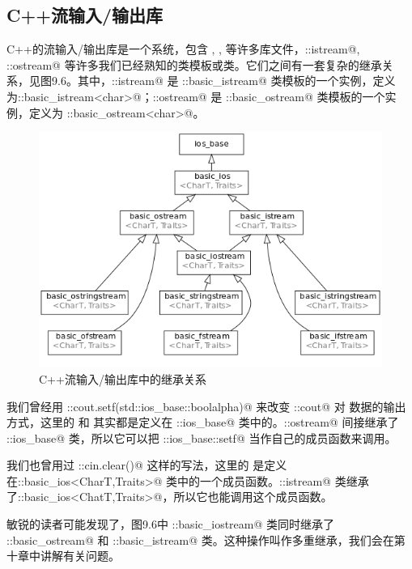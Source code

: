 \subsection*{C++流输入/输出库}
C++的流输入/输出库是一个系统，包含 \lstinline@iostream@, \lstinline@fstream@, \lstinline@sstream@ 等许多库文件，\newline\lstinline@std::istream@, \lstinline@std::ostream@ 等许多我们已经熟知的类模板或类。它们之间有一套复杂的继承关系，见图9.6。其中，\lstinline@std::istream@ 是 \lstinline@std::basic_istream@ 类模板的一个实例，定义为\newline\lstinline@std::basic_istream<char>@；\lstinline@std::ostream@ 是 \lstinline@std::basic_ostream@ 类模板的一个实例，定义为 \lstinline@std::basic_ostream<char>@。\par
\begin{figure}[htbp]
    \centering
    \includegraphics[width=.8\textwidth]{../images/generalized_parts/09_inheritance_diagram_of_io_library.png}
    \caption{C++流输入/输出库中的继承关系}
\end{figure}
我们曾经用 \lstinline@std::cout.setf(std::ios_base::boolalpha)@ 来改变 \lstinline@std::cout@ 对 \lstinline@bool@ 数据的输出方式，这里的 \lstinline@setf@ 和 \lstinline@fmtflags@ 其实都是定义在 \lstinline@std::ios_base@ 类中的。\lstinline@std::ostream@ 间接继承了 \lstinline@std::ios_base@ 类，所以它可以把 \lstinline@std::ios_base::setf@ 当作自己的成员函数来调用。\par
我们也曾用过 \lstinline@std::cin.clear()@ 这样的写法，这里的 \lstinline@clear@ 是定义在\newline\lstinline@std::basic_ios<CharT,Traits>@ 类中的一个成员函数。\lstinline@std::istream@ 类继承了\newline\lstinline@std::basic_ios<ChatT,Traits>@，所以它也能调用这个成员函数。\par
敏锐的读者可能发现了，图9.6中 \lstinline@std::basic_iostream@ 类同时继承了 \lstinline@std::basic_ostream@ 和 \lstinline@std::basic_istream@ 类。这种操作叫作多重继承，我们会在第十章中讲解有关问题。\par

